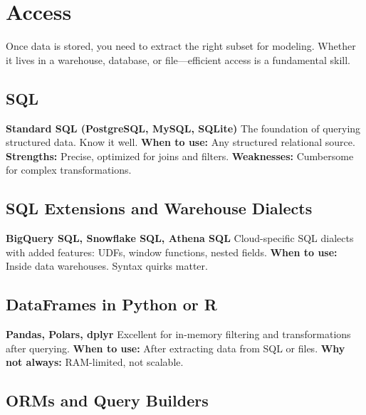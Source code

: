 \documentclass[12pt,openany]{book}
\begin{document}
\section{Access}

Once data is stored, you need to extract the right subset for modeling. Whether it lives in a warehouse, database, or file—efficient access is a fundamental skill.

\subsection*{SQL}

\textbf{Standard SQL (PostgreSQL, MySQL, SQLite)} \newline
The foundation of querying structured data. Know it well. \newline
\textbf{When to use:} Any structured relational source. \newline
\textbf{Strengths:} Precise, optimized for joins and filters. \newline
\textbf{Weaknesses:} Cumbersome for complex transformations.

\subsection*{SQL Extensions and Warehouse Dialects}

\textbf{BigQuery SQL, Snowflake SQL, Athena SQL} \newline
Cloud-specific SQL dialects with added features: UDFs, window functions, nested fields. \newline
\textbf{When to use:} Inside data warehouses. Syntax quirks matter.

\subsection*{DataFrames in Python or R}

\textbf{Pandas, Polars, dplyr} \newline
Excellent for in-memory filtering and transformations after querying. \newline
\textbf{When to use:} After extracting data from SQL or files. \newline
\textbf{Why not always:} RAM-limited, not scalable.

\subsection*{ORMs and Query Builders}
\end{document}
